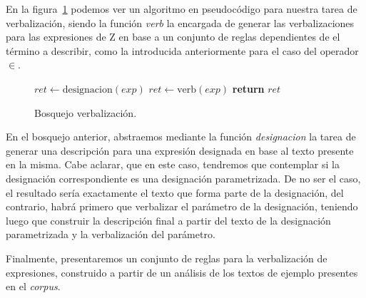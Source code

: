 En la figura~\ref{fig:algoritmo-verbalizacion} podemos ver un algoritmo en pseudocódigo para nuestra tarea de verbalización, siendo la función \emph{verb} la encargada de generar las verbalizaciones para las expresiones de Z en base a un conjunto de reglas dependientes de el término a describir, como la introducida anteriormente para el caso del operador $\in$.

\begin{figure}[H]
\begin{algorithmic}
\State $ret\gets \text{designacion}(exp)$
\Else
\State $ret\gets \text{verb}(exp)$
\EndIf
\State \textbf{return} $ret$
\EndFunction
\end{algorithmic}
\caption{Bosquejo verbalización.}
\label{fig:algoritmo-verbalizacion}
\end{figure}

En el bosquejo anterior, abstraemos mediante la función \emph{designacion} la tarea de generar una descripción para una expresión designada en base al texto presente en la misma. Cabe aclarar, que en este caso, tendremos que contemplar si la designación correspondiente es una designación parametrizada. De no ser el caso, el resultado sería exactamente el texto que forma parte de la designación, del contrario, habrá primero que verbalizar el parámetro de la designación, teniendo luego que construir la descripción final a partir del texto de la designación parametrizada y la verbalización del parámetro.

Finalmente, presentaremos un conjunto de reglas para la verbalización de expresiones, construido a partir de un análisis de los textos de ejemplo presentes en el \emph{corpus}.

